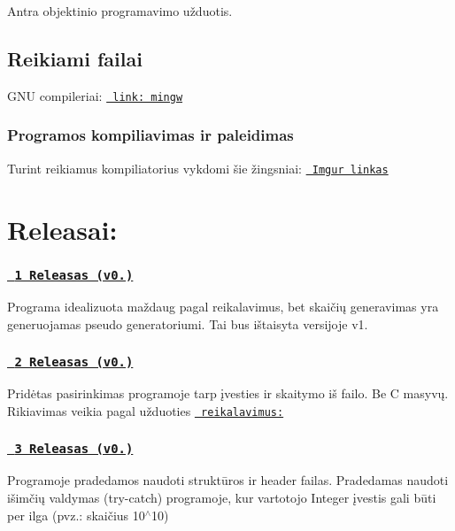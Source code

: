 Antra objektinio programavimo užduotis. \subsection*{Reikiami failai}


\begin{DoxyItemize}
\item G\+NU compileriai\+: \href{http://www.mingw.org}{\texttt{ link\+: mingw}} \subsubsection*{Programos kompiliavimas ir paleidimas}
\end{DoxyItemize}

Turint reikiamus kompiliatorius vykdomi šie žingsniai\+: \href{https://imgur.com/a/yB0usfs}{\texttt{ Imgur linkas}} \section*{Releasai\+:}

\subsubsection*{\href{https://github.com/Dr1dd/2-u-d./releases/tag/v0.1}{\texttt{ 1 Releasas (v0.)}}}

Programa idealizuota maždaug pagal reikalavimus, bet skaičių generavimas yra generuojamas pseudo generatoriumi. Tai bus ištaisyta versijoje v1. \subsubsection*{\href{https://github.com/Dr1dd/2-u-d./releases/tag/v0.2}{\texttt{ 2 Releasas (v0.)}}}

Pridėtas pasirinkimas programoje tarp įvesties ir skaitymo iš failo. Be C masyvų. Rikiavimas veikia pagal užduoties \href{https://github.com/objprog/paskaitos2019/wiki/2-oji-u%C5%BEduotis\#reikalavimai-versijai-v02-terminas-2019-02-24-}{\texttt{ reikalavimus\+:}} \subsubsection*{\href{https://github.com/Dr1dd/2-u-d./releases/tag/v0.3}{\texttt{ 3 Releasas (v0.\+3)}}}

Programoje pradedamos naudoti struktūros ir header failas. Pradedamas naudoti išimčių valdymas (try-\/catch) programoje, kur vartotojo Integer įvestis gali būti per ilga (pvz.\+: skaičius 10$^\wedge$10) 
\begin{DoxyCode}{0}
\DoxyCodeLine{    \}}
\DoxyCodeLine{        }
\DoxyCodeLine{    \}}
\DoxyCodeLine{\}}
\end{DoxyCode}
